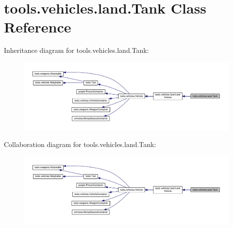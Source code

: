 \hypertarget{classtools_1_1vehicles_1_1land_1_1_tank}{}\section{tools.\+vehicles.\+land.\+Tank Class Reference}
\label{classtools_1_1vehicles_1_1land_1_1_tank}


Inheritance diagram for tools.\+vehicles.\+land.\+Tank\+:
\nopagebreak
\begin{figure}[H]
\begin{center}
\leavevmode
\includegraphics[width=350pt]{classtools_1_1vehicles_1_1land_1_1_tank__inherit__graph}
\end{center}
\end{figure}


Collaboration diagram for tools.\+vehicles.\+land.\+Tank\+:
\nopagebreak
\begin{figure}[H]
\begin{center}
\leavevmode
\includegraphics[width=350pt]{classtools_1_1vehicles_1_1land_1_1_tank__coll__graph}
\end{center}
\end{figure}
